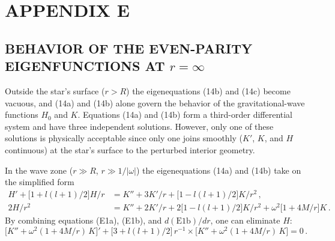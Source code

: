 \section*{APPENDIX E}
\subsection*{BEHAVIOR OF THE EVEN-PARITY EIGENFUNCTIONS AT $r = \infty$}

Outside the star's surface ($r > R$) the eigenequations (14b) and (14c) become vacuous, and
(14a) and (14b) alone govern the behavior of the gravitational-wave functions $H_0$ and $K$.
Equations (14a) and (14b) form a third-order differential system and have three independent
solutions. However, only one of these solutions is physically acceptable since only one joins
smoothly ($K'$, $K$, and $H$ continuous) at the star's surface to the perturbed interior geometry.

In the wave zone ($r \gg R$, $r \gg 1/|\omega|$) the eigenequations (14a) and (14b) take on the
simplified form
%
\begin{align}
H' + \bigl[1 + l(l+1)/2\bigr] H/r
  &= K'' + 3K'/r + \bigl[1 - l(l+1)/2\bigr] K/r^2 \,,
\tag{E1a}\\[4pt]
2H/r^2
  &= K'' + 2K'/r + 2\bigl[1 - l(l+1)/2\bigr] K/r^2 + \omega^2\bigl[1 + 4M/r\bigr] K \,.
\tag{E1b}
\end{align}
%
By combining equations (E1a), (E1b), and $d(\text{E1b})/dr$, one can eliminate $H$:
%
\begin{equation}
\bigl[K'' + \omega^2(1 + 4M/r)\,K\bigr]'
+ \bigl[3 + l(l+1)/2\bigr]\,r^{-1}
\times \bigl[K'' + \omega^2(1 + 4M/r)\,K\bigr] = 0 \,.
\tag{E2}
\end{equation}
